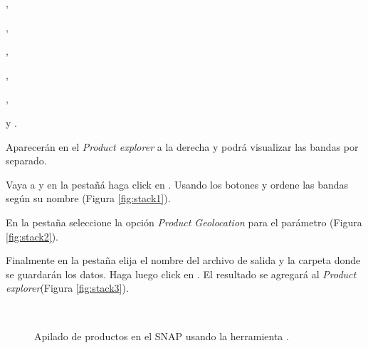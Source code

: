 \begin{center} ,
\end{center}
\begin{center} ,
\end{center}
\begin{center} ,
\end{center}
\begin{center} ,
\end{center}
\begin{center} ,
\end{center}
\begin{center} 
\end{center}
\begin{center} y .
\end{center}

Aparecerán en el \emph{Product explorer} a la derecha y podrá visualizar las bandas por separado.

Vaya a  y en la pestañá  haga click en . Usando los botones  y  ordene las bandas según su nombre (Figura \ref{fig:stack1}).

En la pestaña  seleccione la opción \emph{Product Geolocation} para el parámetro  (Figura \ref{fig:stack2}).

Finalmente en la pestaña  elija el nombre del archivo de salida y la carpeta donde se guardarán los datos. Haga luego click en . El resultado se agregará al \emph{Product explorer}(Figura \ref{fig:stack3}).

\begin{figure}[h!]
    \centering
    \hspace{1cm}
    \\
    \caption{Apilado de productos en el SNAP usando la herramienta .}

\end{figure}

